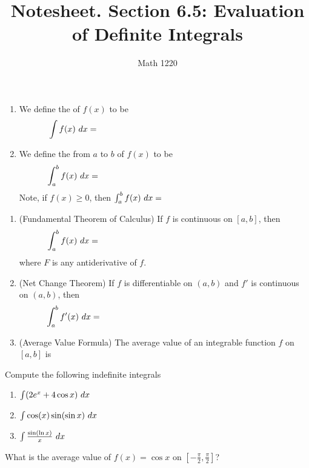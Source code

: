\documentclass[12pt, a4paper]{article}
\author{Math 1220}
\title{Notesheet. Section 6.5: Evaluation of Definite Integrals}
\date{}
\begin{document}
\maketitle
\nameline
\begin{defi}
  \begin{enumerate}
  \item We define the  of \(f(x)\) to be \[
      \int f(x) \dx = \hspace{3in}
    \]
  \item We define the  from \(a\) to \(b\) of
    \(f(x)\) to be \[
      \int_a^b f(x) \dx = \hspace{3in}
    \]
    Note, if \(f(x) \geq 0\), then \(\int_a^b f(x) \ d x = \)
  \end{enumerate}
\end{defi}
\begin{thrm}
  \begin{enumerate}
  \item (Fundamental Theorem of Calculus)   If \(f\) is continuous on
    \([a,b]\), then \[
    \int_a^b f(x) \dx = \hspace{3in}
  \]
  where \(F\) is any antiderivative of \(f\). 
  \item (Net Change Theorem) If \(f\) is differentiable on \((a,b)\)
    and \(f'\) is continuous on \((a,b)\), then \[
      \int_a^b f'(x) \dx = \hspace{3in}
    \]
  \item (Average Value Formula) The average value of an integrable
    function \(f\) on \([a,b]\) is 
  \end{enumerate}
\end{thrm}
\begin{ex}
  Compute the following indefinite integrals
  \begin{enumerate}
  \item \(\int (2e^x+4\cos x) \ d x\)
    \vspace{0.5in}
  \item \(\int \cos(x) \sin(\sin x) \ d x\)
        \vspace{0.5in}
  \item \(\int \frac{\sin(\ln x)}{x} \ d x\)
  \end{enumerate}
\end{ex}
\vspace{-1in}
\begin{ex}
  What is the average value of \(f(x) = \cos x\) on \(\left[-\frac{\pi}{2}, \frac{\pi}{2}\right]\)?
\end{ex}
\end{document}
